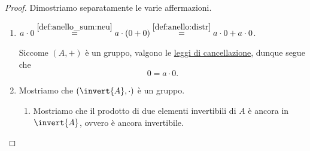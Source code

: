 \begin{proof}
    Dimostriamo separatamente le varie affermazioni.
    \begin{enumerate}[label={(\roman*)}]
        \item $a \cdot 0 \stackrel{\ref{def:anello_sum:neu}}{=} a \cdot (0 + 0) \stackrel{\ref{def:anello:distr}}{=} a \cdot 0 + a \cdot 0$.
        
        Siccome $(A, +)$ è un gruppo, valgono le \hyperref[prop:prop_grp:canc]{leggi di cancellazione}, dunque segue che \[
            0 = a \cdot 0.    
        \]
        \item Mostriamo che $(\invert{A}, \cdot)$ è un gruppo.
        \begin{enumerate}[label={(G\arabic*)}]
            \item Mostriamo che il prodotto di due elementi invertibili di $A$ è ancora in $\invert{A}$, ovvero è ancora invertibile.
            

\end{enumerate}
\end{enumerate}
\end{proof}
